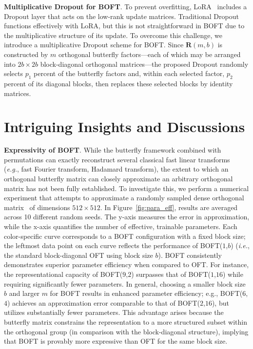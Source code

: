 \textbf{Multiplicative Dropout for BOFT}. To prevent overfitting, LoRA~\cite{hulora2022} includes a Dropout layer that acts on the low-rank update matrices. Traditional Dropout~\cite{srivastava2014dropout} functions effectively with LoRA, but this is not straightforward in BOFT due to the multiplicative structure of its update. To overcome this challenge, we introduce a multiplicative Dropout scheme for BOFT. Since $\bm{R}(m,b)$ is constructed by $m$ orthogonal butterfly factors—each of which may be arranged into $2b \times 2b$ block-diagonal orthogonal matrices—the proposed Dropout randomly selects $p_1$ percent of the butterfly factors and, within each selected factor, $p_2$ percent of its diagonal blocks, then replaces these selected blocks by identity matrices. 

\section{Intriguing Insights and Discussions}

\textbf{Expressivity of BOFT}. While the butterfly framework combined with permutations can exactly reconstruct several classical fast linear transforms~\cite{dao2019learning,dao2019kaleidoscope} (\emph{e.g.}, fast Fourier transform, Hadamard transform), the extent to which an orthogonal butterfly matrix can closely approximate an arbitrary orthogonal matrix has not been fully established. To investigate this, we perform a numerical experiment that attempts to approximate a randomly sampled dense orthogonal matrix~\cite{anderson1987generation} of dimensions $512\times 512$. In Figure~\ref{fig:para_eff}, results are averaged across 10 different random seeds. The y-axis measures the error in approximation, while the x-axis quantifies the number of effective, trainable parameters. Each color-specific curve corresponds to a BOFT configuration with a fixed block size; the leftmost data point on each curve reflects the performance of BOFT($1$,$b$) (\emph{i.e.}, the standard block-diagonal OFT using block size $b$). BOFT consistently demonstrates superior parameter efficiency when compared to OFT. For instance, the representational capacity of BOFT($9$,$2$) surpasses that of BOFT($1$,$16$) while requiring significantly fewer parameters. In general, choosing a smaller block size $b$ and larger $m$ for BOFT results in enhanced parameter efficiency; e.g., BOFT($6$,$4$) achieves an approximation error comparable to that of BOFT($2$,$16$), but utilizes substantially fewer parameters. This advantage arises because the butterfly matrix constrains the representation to a more structured subset within the orthogonal group (in comparison with the block-diagonal structure), implying that BOFT is provably more expressive than OFT for the same block size.


